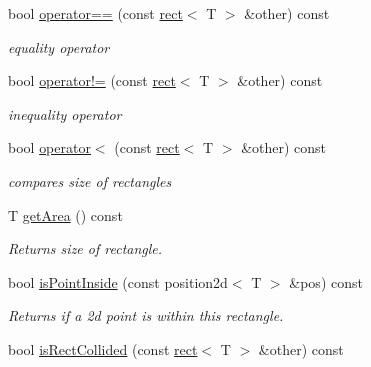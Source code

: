 \begin{DoxyCompactItemize}
\mbox{\label{classirr_1_1core_1_1rect_a2753c5716b6618caff8c6b7aded30c90}} 
bool \hyperlink{classirr_1_1core_1_1rect_a2753c5716b6618caff8c6b7aded30c90}{operator==} (const \hyperlink{classirr_1_1core_1_1rect}{rect}$<$ T $>$ \&other) const
\begin{DoxyCompactList}\small\item\em equality operator \end{DoxyCompactList}\item 
\mbox{\label{classirr_1_1core_1_1rect_ad5ffad1c869006645af9a10e8bc7b905}} 
bool \hyperlink{classirr_1_1core_1_1rect_ad5ffad1c869006645af9a10e8bc7b905}{operator!=} (const \hyperlink{classirr_1_1core_1_1rect}{rect}$<$ T $>$ \&other) const
\begin{DoxyCompactList}\small\item\em inequality operator \end{DoxyCompactList}\item 
\mbox{\label{classirr_1_1core_1_1rect_a8af20faabcbf8880c1846a16e604c921}} 
bool \hyperlink{classirr_1_1core_1_1rect_a8af20faabcbf8880c1846a16e604c921}{operator$<$} (const \hyperlink{classirr_1_1core_1_1rect}{rect}$<$ T $>$ \&other) const
\begin{DoxyCompactList}\small\item\em compares size of rectangles \end{DoxyCompactList}\item 
\mbox{\label{classirr_1_1core_1_1rect_a1a9c505a1eb91ccb3e3915c61f9fb26d}} 
T \hyperlink{classirr_1_1core_1_1rect_a1a9c505a1eb91ccb3e3915c61f9fb26d}{get\+Area} () const
\begin{DoxyCompactList}\small\item\em Returns size of rectangle. \end{DoxyCompactList}\item 
bool \hyperlink{classirr_1_1core_1_1rect_a34c84ad8ff423a4b657eedbcd112afb3}{is\+Point\+Inside} (const position2d$<$ T $>$ \&pos) const
\begin{DoxyCompactList}\small\item\em Returns if a 2d point is within this rectangle. \end{DoxyCompactList}\item 
bool \hyperlink{classirr_1_1core_1_1rect_ab94b7d9da434c7b08761426e296c2f3e}{is\+Rect\+Collided} (const \hyperlink{classirr_1_1core_1_1rect}{rect}$<$ T $>$ \&other) const

\end{DoxyCompactItemize}
